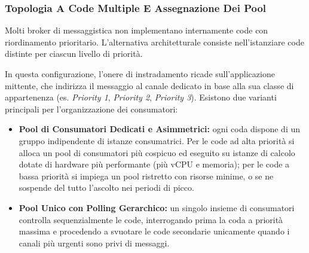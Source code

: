 \documentclass[11pt, a4paper]{article}
\begin{document}
\subsubsection{Topologia A Code Multiple E Assegnazione Dei Pool}

Molti broker di messaggistica non implementano internamente code con riordinamento prioritario. L'alternativa architetturale consiste nell'istanziare code distinte per ciascun livello di priorità.


In questa configurazione, l'onere di instradamento ricade sull'applicazione mittente, che indirizza il messaggio al canale dedicato in base alla sua classe di appartenenza (es. \emph{Priority 1}, \emph{Priority 2}, \emph{Priority 3}). Esistono due varianti principali per l'organizzazione dei consumatori:

\begin{itemize}
    \item \textbf{Pool di Consumatori Dedicati e Asimmetrici:} ogni coda dispone di un gruppo indipendente di istanze consumatrici. Per le code ad alta priorità si alloca un pool di consumatori più cospicuo ed eseguito su istanze di calcolo dotate di hardware più performante (più vCPU e memoria); per le code a bassa priorità si impiega un pool ristretto con risorse minime, o se ne sospende del tutto l'ascolto nei periodi di picco.
    \item \textbf{Pool Unico con Polling Gerarchico:} un singolo insieme di consumatori controlla sequenzialmente le code, interrogando prima la coda a priorità massima e procedendo a svuotare le code secondarie unicamente quando i canali più urgenti sono privi di messaggi.
\end{itemize}
\end{document}
